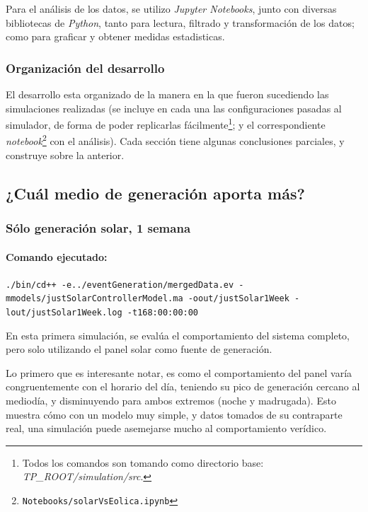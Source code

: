 Para el análisis de los datos, se utilizo \textit{Jupyter Notebooks}, junto
con diversas bibliotecas de \textit{Python}, tanto para lectura, filtrado y
transformación de los datos; como para graficar y obtener medidas
estadisticas.

\pagebreak
\subsubsection{Organización del desarrollo}
El desarrollo esta organizado de la manera en la que fueron sucediendo las
simulaciones realizadas (se incluye en cada una las configuraciones pasadas
al simulador, de forma de poder replicarlas fácilmente\footnote{Todos los
comandos son tomando como directorio base:
\textit{TP\_ROOT/simulation/src}.}; y el correspondiente \textit{notebook}\footnote{\texttt{Notebooks/solarVsEolica.ipynb}}
con el análisis). Cada sección tiene algunas conclusiones parciales, y
construye sobre la anterior.

\subsection{¿Cuál medio de generación aporta más?}

    \hypertarget{suxf3lo-generaciuxf3n-solar-1-semana}{%
\subsubsection{Sólo generación solar, 1
semana}\label{suxf3lo-generaciuxf3n-solar-1-semana}}

\hypertarget{comando-ejecutado}{%
\paragraph{Comando ejecutado:}\label{comando-ejecutado}}

\texttt{./bin/cd++ -e../eventGeneration/mergedData.ev
-mmodels/justSolarControllerModel.ma -oout/justSolar1Week
-lout/justSolar1Week.log -t168:00:00:00}

    En esta primera simulación, se evalúa el comportamiento del sistema
completo, pero solo utilizando el panel solar como fuente de generación.

Lo primero que es interesante notar, es como el comportamiento del panel
varía congruentemente con el horario del día, teniendo su pico de
generación cercano al mediodía, y disminuyendo para ambos extremos
(noche y madrugada). Esto muestra cómo con un modelo muy simple, y datos
tomados de su contraparte real, una simulación puede asemejarse mucho al
comportamiento verídico.

